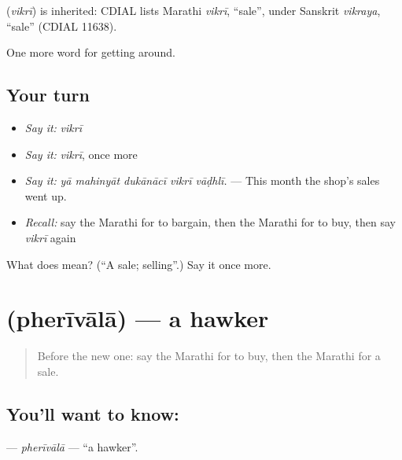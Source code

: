 \begin{cousinweb}
\textbf{} (\emph{vikrī}) is inherited: CDIAL lists Marathi \emph{vikrī}, \textquotedblleft{}sale\textquotedblright{}, under Sanskrit \emph{vikraya}, \textquotedblleft{}sale\textquotedblright{} (CDIAL 11638).
\end{cousinweb}

\begin{grammarlens}[title={What you've built}]
One more word for getting around.
\end{grammarlens}

\subsection*{Your turn}
\begin{itemize}
\raggedright
  \item \emph{Say it:} \emph{vikrī}
  \item \emph{Say it:} \emph{vikrī}, once more
  \item \emph{Say it:} \emph{yā mahinyāt dukānācī vikrī vāḍhlī.} — This month the shop’s sales went up.
  \item \emph{Recall:} say the Marathi for to bargain, then the Marathi for to buy, then say \emph{vikrī} again
\end{itemize}

\begin{tcolorbox}[breakable,colback=teal!4,colframe=teal!35!black,title={Before you move on}]
What does  mean? (\textquotedblleft{}A sale; selling\textquotedblright{}.) Say it once more.
\end{tcolorbox}
\section[\texorpdfstring{\mr{फेरीवाला} (pherīvālā)}{फेरीवाला (pherīvālā)}]{ (pherīvālā) — a hawker}

\label{lesson:MR-C424-pherivala}



\begin{quote}
Before the new one: say the Marathi for to buy, then the Marathi for a sale.
\end{quote}

\subsection*{You'll want to know: }
\textbf{} — \emph{pherīvālā} — \textquotedblleft{}a hawker\textquotedblright{}.

